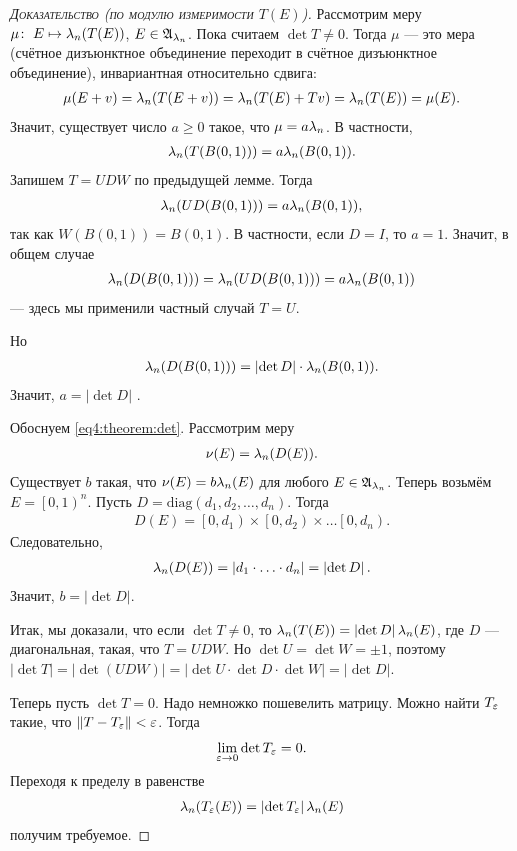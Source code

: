 \begin{proof}[\normalfont\textsc{Доказательство (по модулю измеримости $T(E)$)}]
 Рассмотрим меру $\mu \colon\; E \mapsto \lambda_n(T(E))$, $E \in \mathfrak{A}_{\lambda_n}$. Пока считаем $\det T \neq 0$. Тогда $\mu$ --- это мера (счётное дизъюнктное объединение переходит в счётное дизъюнктное объединение), инвариантная относительно сдвига: \begin{align*}
  \mu(E + v) = \lambda_n(T(E + v)) = \lambda_n(T(E) + Tv) = \lambda_n(T(E)) = \mu(E)
 .\end{align*} Значит, существует число $a \geqslant 0$ такое, что $\mu = a\lambda_n$. В частности, \begin{align*}
  \lambda_n(T(B(0,1))) = a \lambda_n(B(0, 1))
 .\end{align*} Запишем $T = UDW$ по предыдущей лемме. Тогда \begin{align*}
  \lambda_n(UD(B(0, 1))) = a\lambda_n(B(0, 1))
 ,\end{align*} так как $W(B(0, 1)) = B(0, 1)$. В частности, если $D = I$, то $a = 1$. Значит, в общем случае \begin{align*}
  \lambda_n(D(B(0, 1))) = \lambda_n(UD(B(0, 1))) = a\lambda_n(B(0,1))
 \end{align*} --- здесь мы применили частный случай $T = U$.

 Но 
\begin{align}
 \label{eq4:theorem:det}
\lambda_n(D(B(0, 1))) = \left| \det D \right| \cdot \lambda_n(B(0, 1))
.\end{align} Значит, $a = \left| \det D \right|$ .

Обоснуем \eqref{eq4:theorem:det}. Рассмотрим меру \begin{align*}
 \nu(E) = \lambda_n(D(E))
.\end{align*}  Существует $b$  такая, что $\nu(E) = b\lambda_n(E)$ для любого $E \in \mathfrak{A}_{\lambda_n}$.  Теперь возьмём $E = \left[0, 1\right)^{n}$. Пусть $D = \mathrm{diag}(d_1, d_2, \ldots, d_n)$. Тогда \begin{align*}
D(E) = \left[0, d_1\right) \times \left[0, d_2\right) \times \ldots \left[0, d_n\right)
.\end{align*} Следовательно, \begin{align*}
 \lambda_n(D(E)) = \left| d_1 \cdot \ldots \cdot d_n \right| = \left| \det D \right|
.\end{align*} Значит, $b = \left| \det D \right|$.

Итак, мы доказали, что если $\det T \neq 0$, то $\lambda_n(T(E)) = \left| \det D \right| \lambda_n(E)$, где $D$ --- диагональная, такая, что $T = UDW$. Но $\det U = \det W = \pm 1$, поэтому $\left| \det T \right| = \left| \det (UDW) \right| = \left| \det U \cdot \det D \cdot \det W \right| = \left| \det D \right|$.

Теперь пусть $\det T = 0$. Надо немножко пошевелить матрицу. Можно найти $T_{\varepsilon}$ такие, что $\left\| T - T_{\varepsilon} \right\| < \varepsilon$. Тогда \begin{align*}
 \lim_{\varepsilon \to 0} \det T_{\varepsilon} = 0
.\end{align*} Переходя к пределу в равенстве \begin{align*}
\lambda_n(T_{\varepsilon}(E)) = \left| \det T_{\varepsilon} \right| \lambda_n(E)
\end{align*} получим требуемое.
 
\end{proof}

